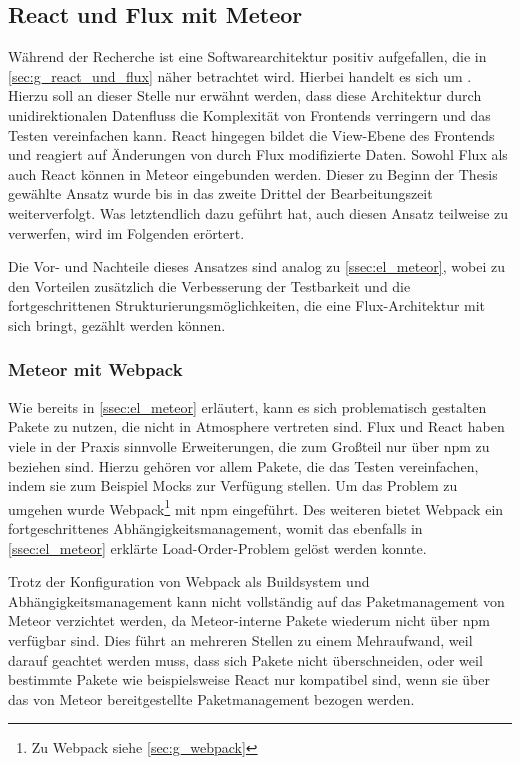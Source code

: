 \subsection{React und Flux mit Meteor}
\label{ssec:el_react_und_flux_mit_meteor}

Während der Recherche ist eine Softwarearchitektur positiv aufgefallen, die in
\cref{sec:g_react_und_flux} näher betrachtet wird.  Hierbei handelt es sich um
.  Hierzu soll an dieser Stelle nur erwähnt werden, dass diese
Architektur durch unidirektionalen Datenfluss die Komplexität von Frontends
verringern und das Testen vereinfachen kann.  React hingegen bildet die
View-Ebene des Frontends und reagiert auf Änderungen von durch Flux
modifizierte Daten.  Sowohl Flux als auch React können in Meteor eingebunden
werden.  Dieser zu Beginn der Thesis gewählte Ansatz wurde bis in das zweite
Drittel der Bearbeitungszeit weiterverfolgt.  Was letztendlich dazu geführt hat,
auch diesen Ansatz teilweise zu verwerfen, wird im Folgenden erörtert.

Die Vor- und Nachteile dieses Ansatzes sind analog zu \cref{ssec:el_meteor},
wobei zu den Vorteilen zusätzlich die Verbesserung der Testbarkeit und die
fortgeschrittenen Strukturierungsmöglichkeiten, die eine Flux-Architektur mit
sich bringt, gezählt werden können.

\subsubsection{Meteor mit Webpack}
\label{sssec:elf_meteor_mit_webpack}

Wie bereits in \cref{ssec:el_meteor} erläutert, kann es sich problematisch
gestalten Pakete zu nutzen, die nicht in Atmosphere vertreten sind.  Flux und
React haben viele in der Praxis sinnvolle Erweiterungen, die zum Großteil nur
über npm zu beziehen sind.  Hierzu gehören vor allem Pakete, die das Testen
vereinfachen, indem sie zum Beispiel Mocks zur Verfügung stellen.  Um das
Problem zu umgehen wurde Webpack\footnote{Zu Webpack siehe \cref{sec:g_webpack}}
mit npm eingeführt.  Des weiteren bietet Webpack ein fortgeschrittenes
Abhängigkeitsmanagement, womit das ebenfalls in \cref{ssec:el_meteor} erklärte
Load-Order-Problem gelöst werden konnte.

Trotz der Konfiguration von Webpack als Buildsystem und Abhängigkeitsmanagement
kann nicht vollständig auf das Paketmanagement von Meteor verzichtet werden, da
Meteor-interne Pakete wiederum nicht über npm verfügbar sind.  Dies führt an
mehreren Stellen zu einem Mehraufwand, weil darauf geachtet werden muss, dass
sich Pakete nicht überschneiden, oder weil bestimmte Pakete wie beispielsweise
React nur kompatibel sind, wenn sie über das von Meteor bereitgestellte
Paketmanagement bezogen werden.

